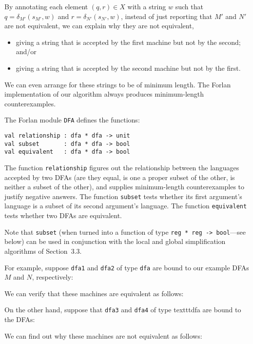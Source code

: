 By annotating each element $(q,r)\in X$ with a string $w$ such that
$q=\delta_{M'}(s_{M'},w)$ and $r=\delta_{N'}(s_{N'},w)$, instead of
just reporting that $M'$ and $N'$ are not equivalent, we can
explain why they are not equivalent,
\begin{itemize}
\item giving a string that is accepted by the first machine but not by
  the second; and/or

\item giving a string that is accepted by the second machine but not
  by the first.
\end{itemize}
We can even arrange for these strings to be of minimum length.
The Forlan implementation of our algorithm always produces minimum-length
counterexamples.

The Forlan module \texttt{DFA} defines the functions:
\begin{verbatim}
val relationship : dfa * dfa -> unit
val subset       : dfa * dfa -> bool
val equivalent   : dfa * dfa -> bool
\end{verbatim}
%
%
%
The function \texttt{relationship} figures out the relationship
between the languages accepted by two DFAs (are they equal, is one a
proper subset of the other, is neither a subset of the other), and
supplies minimum-length counterexamples to justify negative answers.
The function \texttt{subset} tests whether its first argument's
language is a subset of its second argument's language.
The function \texttt{equivalent} tests whether two DFAs are
equivalent.

Note that \texttt{subset} (when turned into a function of type
\texttt{reg~*~reg~->~bool}---see below) can be used in conjunction
with the local and global simplification algorithms of Section~3.3.

For example, suppose \texttt{dfa1} and \texttt{dfa2} of type \texttt{dfa} are
bound to our example DFAs $M$ and $N$, respectively:
\begin{center}

\end{center}
We can verify that these machines are equivalent as follows:


On the other hand, suppose that \texttt{dfa3} and \texttt{dfa4} of type
texttt{dfa} are bound to the DFAs:
\begin{center}

\end{center}
We can find out why these machines are not equivalent as follows:



